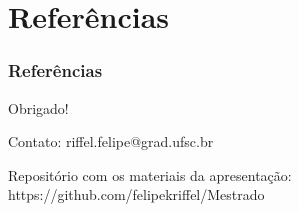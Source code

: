 \documentclass{beamer}
\begin{document}
\section{Referências}
\begin{frame}
\tableofcontents[currentsection]
\end{frame}

\begin{frame}
\frametitle{Referências}
\vspace{-2em}
\scriptsize

    
\end{frame}

\begin{frame}

\begin{center}
\Large Obrigado!
\end{center}

\vspace{1em}
Contato: riffel.felipe@grad.ufsc.br 

\vspace{1em}

Repositório com os materiais da apresentação: https://github.com/felipekriffel/Mestrado
    
\end{frame}
\end{document}
